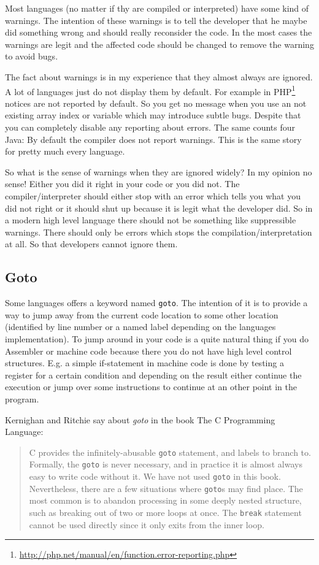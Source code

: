 \documentclass[11pt, a4paper]{report}
\begin{document}
Most languages (no matter if thy are compiled or interpreted) have some kind of warnings. The intention of these warnings is to tell the developer that he maybe did something wrong and should really reconsider the code. In the most cases the warnings are legit and the affected code should be changed to remove the warning to avoid bugs.

The fact about warnings is in my experience that they almost always are ignored. A lot of languages just do not display them by default. For example in PHP\footnote{\url{http://php.net/manual/en/function.error-reporting.php}} notices are not reported by default. So you get no message when you use an not existing array index or variable which may introduce subtle bugs. Despite that you can completely disable any reporting about errors. The same counts four Java: By default the compiler does not report warnings. This is the same story for pretty much every language. 

So what is the sense of warnings when they are ignored widely? In my opinion no sense! Either you did it right in your code or you did not. The compiler/interpreter should either stop with an error which tells you what you did not right or it should shut up because it is legit what the developer did. So in a modern high level language there should not be something like suppressible warnings. There should only be errors which stops the compilation/interpretation at all. So that developers cannot ignore them.

\subsection{Goto}

Some languages offers a keyword named \texttt{goto}. The intention of it is to provide a way to jump away from the current code location to some other location (identified by line number or a named label depending on the languages implementation). To jump around in your code is a quite natural thing if you do Assembler or machine code because there you do not have high level control structures. E.g. a simple if-statement in machine code is done by testing a register for a certain condition and depending on the result either continue the execution or jump over some instructions to continue at an other point in the program.

Kernighan and Ritchie say about \textit{goto} in the book The C Programming Language\cite{c-programming-lang}:

\begin{quotation}
    C provides the infinitely-abusable \texttt{goto} statement, and labels to branch to. Formally, the \texttt{goto} is never necessary, and in practice it is almost always easy to write code without it. We have not used \texttt{goto} in this book.
    Nevertheless, there are a few situations where \texttt{goto}s may find place. The most common is to abandon processing in some deeply nested structure, such as breaking out of two or more loops at once. The \texttt{break} statement cannot be used directly since it only exits from the inner loop.
\end{quotation}
\end{document}
